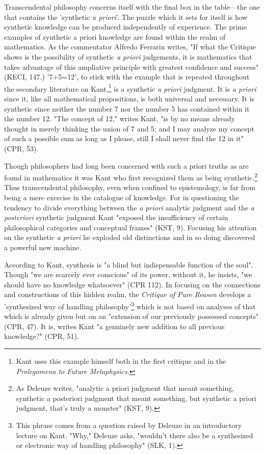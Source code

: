Transcendental philosophy concerns itself with the final box in the table---the one that contains the 'synthetic \textit{a priori}'. The puzzle which it sets for itself is how synthetic knowledge can be produced independently of experience. The prime examples of synthetic a priori knowledge are found within the realm of mathematics. As the commentator Alfredo Ferrarin writes, "If what the Critique shows is the possibility of synthetic \textit{a priori} judgements, it is mathematics that takes advantage of this ampliative principle with greatest confidence and success" (KECI, 147.) '7+5=12', to stick with the example that is repeated throughout the secondary literature on Kant,\footnote{Kant uses this example himself both in the first critique and in the \textit{Prolegomena to Future Metaphysics}.} is a synthetic \textit{a priori} judgment. It is \textit{a priori} since it, like all mathematical propositions, is both universal and necessary. It is synthetic since neither the number 7 nor the number 5 has contained within it the number 12. "The concept of 12," writes Kant, "is by no means already thought in merely thinking the union of 7 and 5; and I may analyze my concept of such a possible sum as long as I please, still I shall never find the 12 in it" (CPR, 53).

Though philosophers had long been concerned with such a priori truths as are found in mathematics it was Kant who first recognized them as being synthetic.\footnote{As Deleuze writes, "analytic a priori judgment that meant something, synthetic a posteriori judgment that meant something, but synthetic a priori judgment, that's truly a monster" (KST, 9).} Thus transcendental philosophy, even when confined to epistemology, is far from being a mere exercise in the catalogue of knowledge. For in questioning the tendency to divide everything between the \textit{a priori} analytic judgment and the \textit{a posteriori} synthetic judgment Kant "exposed the insufficiency of certain philosophical categories and conceptual frames" (KST, 9). Focusing his attention on the synthetic \textit{a priori} he exploded old distinctions and in so doing discovered a powerful new machine. 

According to Kant, synthesis is "a blind but indispensable function of the soul". Though "we are scarcely ever conscious" of its power, without it, he insists, "we should have no knowledge whatsoever" (CPR 112). In focusing on the connections and constructions of this hidden realm, the \textit{Critique of Pure Reason} develops a 'synthesized way of handling philosophy'\footnote{This phrase comes from a question raised by Deleuze in an introductory lecture on Kant. "Why," Deleuze asks, "wouldn't there also be a synthesized or electronic way of handling philosophy" (SLK, 1).} which is not based on analyses of that which is already given but on an "extension of our previously possessed concepts" (CPR, 47). It is, writes Kant "a genuinely new addition to all previous knowledge?" (CPR, 51).

